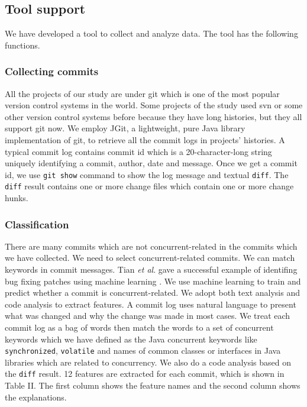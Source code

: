 \subsection{Tool support}
\label{sec:method:tool}
We have developed a tool to collect and analyze data. The tool has the following functions.

\subsubsection{Collecting commits}
All the projects of our study are under git which is one of the most popular version control systems in the world. Some projects of the study used svn or some other version control systems before because they have long histories, but they all support git \cite{books/daglib/0022839} now. We employ JGit, a lightweight, pure Java library implementation of git, to retrieve all the commit logs in projects' histories. A typical commit log contains commit id which is a 20-character-long string uniquely identifying a commit, author, date and message. Once we get a commit id, we use \texttt{git show} command to show the log message and textual \texttt{diff}. The \texttt{diff} result contains one or more change files which contain one or more change hunks.

\subsubsection{Classification}
There are many commits which are not concurrent-related in the commits which we have collected. We need to select concurrent-related commits. We can match keywords in commit messages. Tian \textit{et al}. gave a successful example of identifing bug fixing patches using machine learning \cite{conf/icse/TianLL12}. We use machine learning to train and predict whether a commit is concurrent-related. We adopt both text analysis and code analysis to extract features. A commit log uses natural language to present what was changed and why the change was made in most cases. We treat each commit log as a bag of words then match the words to a set of concurrent keywords which we have defined as the Java concurrent keywords like \texttt{synchronized}, \texttt{volatile} and names of common classes or interfaces in Java libraries which are related to concurrency. We also do a code analysis based on the \texttt{diff} result. 12 features are extracted for each commit, which is shown in Table II. The first column shows the feature names and the second column shows the explanations.

